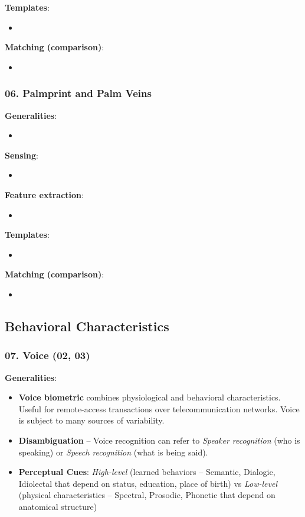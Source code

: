 \documentclass[a4paper]{article}
\begin{document}
      \textbf{Templates}:
      \begin{itemize}
        \item 
      \end{itemize}

      \textbf{Matching (comparison)}:
      \begin{itemize}
        \item 
      \end{itemize}
    \subsubsection*{06. Palmprint and Palm Veins}
      \textbf{Generalities}:
      \begin{itemize}
        \item 
      \end{itemize}

      \textbf{Sensing}:
      \begin{itemize}
        \item 
      \end{itemize}

      \textbf{Feature extraction}:
      \begin{itemize}
        \item 
      \end{itemize}

      \textbf{Templates}:
      \begin{itemize}
        \item 
      \end{itemize}

      \textbf{Matching (comparison)}:
      \begin{itemize}
        \item 
      \end{itemize}
  \subsection*{Behavioral Characteristics}
    \subsubsection*{07. Voice (02, 03)}
      \textbf{Generalities}:
      \begin{itemize}
        \item \textbf{Voice biometric} combines physiological and behavioral characteristics. Useful for remote-access transactions over telecommunication networks. Voice is subject to many sources of variability.
        \item \textbf{Disambiguation} -- Voice recognition can refer to \emph{Speaker recognition} (who is speaking) or \emph{Speech recognition} (what is being said).
        \item \textbf{Perceptual Cues}: \emph{High-level} (learned behaviors -- Semantic, Dialogic, Idiolectal that depend on status, education, place of birth) vs \emph{Low-level} (physical characteristics -- Spectral, Prosodic, Phonetic that depend on anatomical structure)
      \end{itemize}
\end{document}
